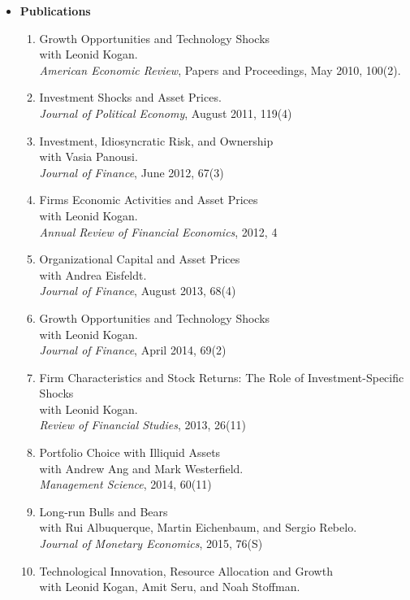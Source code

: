 \documentclass[11pt,letterpaper,serif,overlapped]{res}
\begin{document}
\begin{resume}
\begin{itemize}
\item \textbf{Publications}
\begin{enumerate}
\item Growth Opportunities and Technology Shocks\\ with Leonid Kogan. \\
\emph{American Economic Review}, Papers and Proceedings, May 2010, 100(2).
\item Investment Shocks and Asset Prices.\\
\emph{Journal of Political Economy},  August 2011, 119(4)
\item Investment, Idiosyncratic Risk, and Ownership\\ with Vasia Panousi.\\
\emph{Journal of Finance}, June 2012, 67(3)
\item Firms Economic Activities and Asset Prices\\ with Leonid Kogan. \\
\emph{Annual Review of Financial Economics}, 2012, 4
\item Organizational Capital and Asset Prices\\ with Andrea Eisfeldt.\\
\emph{Journal of Finance}, August 2013, 68(4)
\item Growth Opportunities and Technology Shocks\\ with Leonid Kogan.\\
\emph{Journal of Finance}, April 2014, 69(2)
\item Firm Characteristics and Stock Returns: The Role of Investment-Specific Shocks\\ with Leonid Kogan.\\
\emph{Review of Financial Studies}, 2013, 26(11)
\item Portfolio Choice with Illiquid Assets\\ with Andrew Ang and Mark Westerfield.\\
\emph{Management Science},  2014, 60(11)
\item Long-run Bulls and Bears\\ with Rui Albuquerque, Martin Eichenbaum, and Sergio Rebelo.\\
\emph{Journal of Monetary Economics}, 2015, 76(S)
\item Technological Innovation, Resource Allocation and Growth\\ with Leonid Kogan, Amit Seru, and Noah Stoffman.\\

\end{enumerate}
\end{itemize}
\end{resume}
\end{document}
